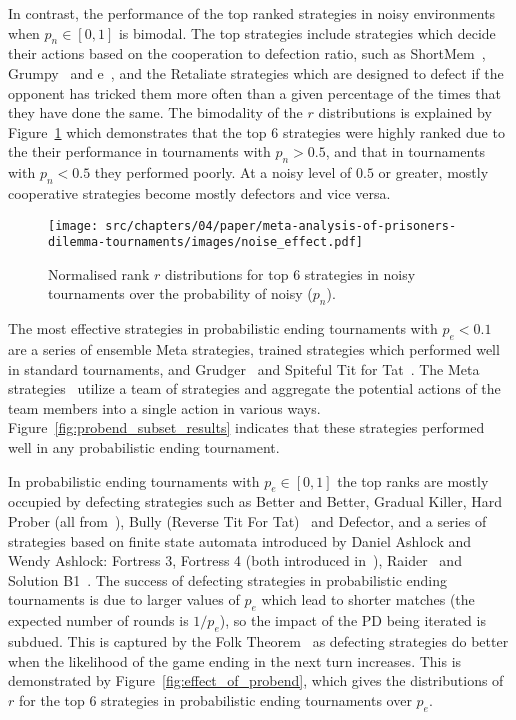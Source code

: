 In contrast, the performance of the top ranked strategies in noisy environments
when \(p_n\in [0, 1]\) is bimodal. The top strategies include strategies which
decide their actions based on the cooperation to defection ratio, such as
ShortMem~\cite{Andre2013}, Grumpy~\cite{axelrodproject} and
e~\cite{axelrodproject}, and the Retaliate strategies which are designed to
defect if the opponent has tricked them more often than a given percentage of the times that
they have done the same. The bimodality of the \(r\) distributions is explained
by Figure~\ref{fig:effect_of_noise} which demonstrates that the top 6 strategies
were highly ranked due to the their performance in tournaments with \(p_n>0.5\),
and that in tournaments with \(p_n<0.5\) they
performed poorly. At a noisy level of \(0.5\) or greater, mostly cooperative strategies
become mostly defectors and vice versa.

\begin{figure}[!htbp]
    \centering
    \texttt{[image: src/chapters/04/paper/meta-analysis-of-prisoners-dilemma-tournaments/images/noise\_effect.pdf]}
    \caption{Normalised rank \(r\) distributions for top 6 strategies in noisy tournaments over
    the probability of noisy ($p_n$).}
    \label{fig:effect_of_noise}
\end{figure}

The most effective strategies in probabilistic ending
tournaments with \(p_e< 0.1\) are a series of ensemble Meta strategies, trained strategies
which performed well
in standard tournaments, and Grudger~\cite{axelrodproject} and Spiteful Tit for
Tat~\cite{prison}. The Meta strategies~\cite{axelrodproject} utilize a team of
strategies and aggregate the potential actions of the team members into a single action
in various ways. Figure~\ref{fig:probend_subset_results} indicates that these strategies
performed well in any probabilistic ending tournament.

In probabilistic ending tournaments with \(p_e \in [0, 1]\) the top ranks are
mostly occupied by defecting strategies such as Better and Better, Gradual
Killer, Hard Prober (all from~\cite{axelrodproject}), Bully (Reverse Tit For
Tat)~\cite{Nachbar1992} and Defector, and a series of strategies based on finite
state automata introduced by Daniel Ashlock and Wendy Ashlock: Fortress 3,
Fortress 4 (both introduced in~\cite{Ashlock2006}), Raider~\cite{Ashlock2014}
and Solution B1~\cite{Ashlock2014}. The success of defecting strategies in
probabilistic ending tournaments is due to larger values of
\(p_e\) which lead to shorter matches (the expected number of rounds is \(1 / p_e\)), so the
impact of the PD being iterated is subdued. This is captured by the Folk
Theorem~\cite{Fudenberg2009} as defecting strategies do better when the likelihood
of the game ending in the next turn increases.
This is demonstrated by Figure~\ref{fig:effect_of_probend}, which gives the
distributions of \(r\) for the top 6 strategies in probabilistic ending tournaments
over \(p_e\).

